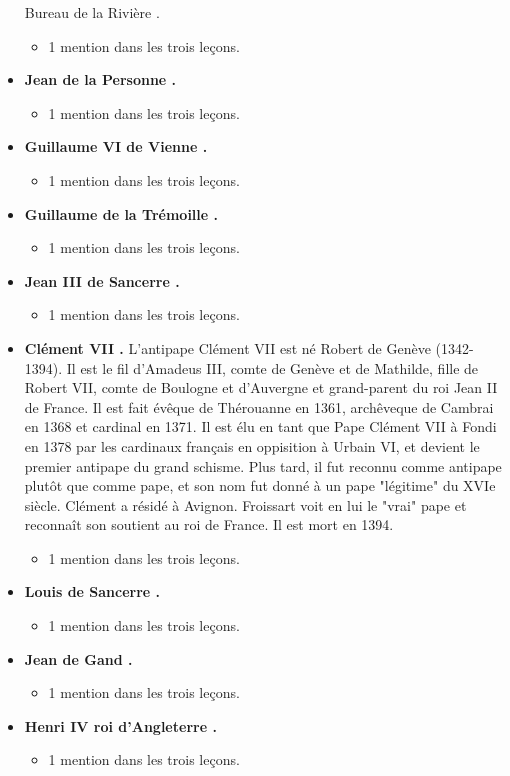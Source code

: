 \documentclass[12pt, a4paper]{article}
\begin{document}
\begin{itemize}
{{				Bureau
				de la
				Rivière
				.}  \begin{itemize} \item{1 mention dans les trois leçons.}  \end{itemize}}  \item{\textbf{
				Jean
				de la
				Personne
				.}  \begin{itemize} \item{1 mention dans les trois leçons.}  \end{itemize}}  \item{\textbf{
				Guillaume
				VI
				de
				Vienne
				.}  \begin{itemize} \item{1 mention dans les trois leçons.}  \end{itemize}}  \item{\textbf{
				Guillaume
				de la
				Trémoille
				.}  \begin{itemize} \item{1 mention dans les trois leçons.}  \end{itemize}}  \item{\textbf{
				Jean
				III
				de
				Sancerre
				.}  \begin{itemize} \item{1 mention dans les trois leçons.}  \end{itemize}}  \item{\textbf{
				Clément
				VII
				.} L'antipape Clément VII est né Robert de Genève (1342-1394). Il est le fil d'Amadeus III, comte de Genève et de Mathilde, fille
			de Robert VII, comte de Boulogne et d'Auvergne et grand-parent du roi Jean II de France. Il est fait évêque de Thérouanne en 1361, archêveque de Cambrai en 1368 et
			cardinal en 1371. Il est élu en tant que Pape Clément VII à Fondi en 1378 par les cardinaux français en oppisition à Urbain VI, et devient le premier antipape du grand schisme.
			Plus tard, il fut reconnu comme antipape plutôt que comme pape, et son nom fut donné à un pape "légitime" du XVIe siècle. Clément a résidé à Avignon. Froissart voit en lui le "vrai"
			pape et reconnaît son soutient au roi de France. Il est mort en 1394. \begin{itemize} \item{1 mention dans les trois leçons.}  \end{itemize}}  \item{\textbf{
				Louis
				de
				Sancerre
				.}  \begin{itemize} \item{1 mention dans les trois leçons.}  \end{itemize}}  \item{\textbf{
				Jean
				de
				Gand
				.}  \begin{itemize} \item{1 mention dans les trois leçons.}  \end{itemize}}  \item{\textbf{
				Henri
				IV
				roi d'Angleterre
				.}  \begin{itemize} \item{1 mention dans les trois leçons.}  \end{itemize}} \end{itemize}
	
\end{document}
